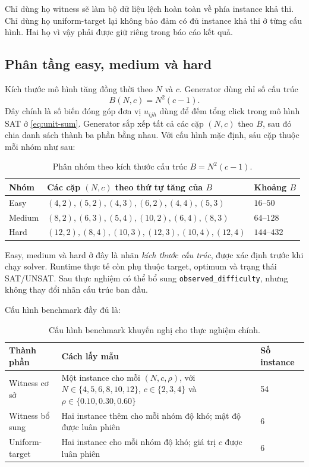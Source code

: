 \documentclass[11pt,a4paper]{article}
\begin{document}
Chỉ dùng họ witness sẽ làm bộ dữ liệu lệch hoàn toàn về phía instance khả
thi. Chỉ dùng họ uniform-target lại không bảo đảm có đủ instance khả thi ở
từng cấu hình. Hai họ vì vậy phải được giữ riêng trong báo cáo kết quả.

\subsection{Phân tầng easy, medium và hard}

Kích thước mô hình tăng đồng thời theo $N$ và $c$. Generator dùng chỉ số
cấu trúc
\begin{equation}\label{eq:structural-score}
  B(N,c)=N^2(c-1).
\end{equation}
Đây chính là số biến đóng góp đơn vị $u_{ijh}$ dùng để đếm tổng click trong
mô hình SAT ở \cref{eq:unit-sum}. Generator sắp xếp tất cả các cặp $(N,c)$
theo $B$, sau đó chia danh sách thành ba phần bằng nhau. Với cấu hình mặc
định, sáu cặp thuộc mỗi nhóm như sau:

\begin{table}[H]
\centering
\caption{Phân nhóm theo kích thước cấu trúc $B=N^2(c-1)$.}
\label{tab:size-tiers}
\begin{tabularx}{\textwidth}{@{}l X l@{}}
\toprule
\textbf{Nhóm} & \textbf{Các cặp $(N,c)$ theo thứ tự tăng của $B$}
& \textbf{Khoảng $B$} \\
\midrule
Easy
& $(4,2),(5,2),(4,3),(6,2),(4,4),(5,3)$
& $16$--$50$ \\
Medium
& $(8,2),(6,3),(5,4),(10,2),(6,4),(8,3)$
& $64$--$128$ \\
Hard
& $(12,2),(8,4),(10,3),(12,3),(10,4),(12,4)$
& $144$--$432$ \\
\bottomrule
\end{tabularx}
\end{table}

\begin{notebox}
Easy, medium và hard ở đây là nhãn \emph{kích thước cấu trúc}, được xác định
trước khi chạy solver. Runtime thực tế còn phụ thuộc target, optimum và trạng
thái SAT/UNSAT. Sau thực nghiệm có thể bổ sung
\texttt{observed\_difficulty}, nhưng không thay đổi nhãn cấu trúc ban đầu.
\end{notebox}

Cấu hình benchmark đầy đủ là:

\begin{table}[H]
\centering
\caption{Cấu hình benchmark khuyến nghị cho thực nghiệm chính.}
\label{tab:data-config}
\begin{tabularx}{\textwidth}{@{}l X l@{}}
\toprule
\textbf{Thành phần} & \textbf{Cách lấy mẫu} & \textbf{Số instance} \\
\midrule
Witness cơ sở
& Một instance cho mỗi $(N,c,\rho)$, với
$N\in\{4,5,6,8,10,12\}$, $c\in\{2,3,4\}$ và
$\rho\in\{0.10,0.30,0.60\}$
& 54 \\
Witness bổ sung
& Hai instance thêm cho mỗi nhóm độ khó; mật độ được luân phiên
& 6 \\
Uniform-target
& Hai instance cho mỗi nhóm độ khó; giá trị $c$ được luân phiên
& 6 \\
\bottomrule
\end{tabularx}
\end{table}
\end{document}
